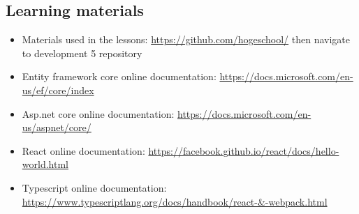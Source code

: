 \subsection{Learning materials}\label{learning-materials}
\begin{itemize}[nolistsep]
\item
  Materials used in the lessons:
  \url{https://github.com/hogeschool/} then navigate to development 5 repository
\item
  Entity framework core online documentation:
  \url{https://docs.microsoft.com/en-us/ef/core/index}
\item
  Asp.net core online documentation:
  \url{https://docs.microsoft.com/en-us/aspnet/core/}
\item
  React online documentation:
  \url{https://facebook.github.io/react/docs/hello-world.html}
\item
  Typescript online documentation:
 \url{https://www.typescriptlang.org/docs/handbook/react-\&-webpack.html}
\end{itemize}

